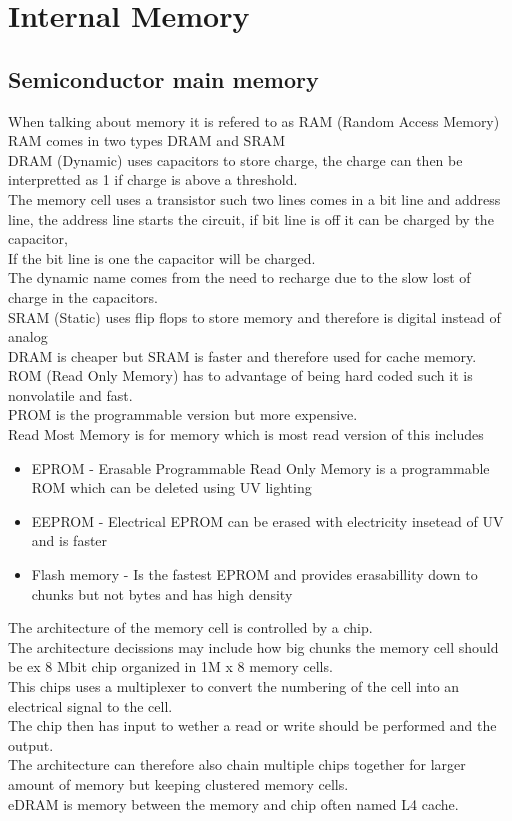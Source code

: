 \documentclass[12pt, a4paper]{article}
\begin{document}
	\section{Internal Memory}
		\subsection{Semiconductor main memory}
			When talking about memory it is refered to as RAM (Random Access Memory)
			RAM comes in two types DRAM and SRAM\\
			DRAM (Dynamic) uses capacitors to store charge, the charge can then be interpretted as 1 if charge is above a threshold.\\
			The memory cell uses a transistor such two lines comes in a bit line and address line, the address line starts the circuit, if bit line is off it can be charged by the capacitor,\\
			If the bit line is one the capacitor will be charged.\\
			The dynamic name comes from the need to recharge due to the slow lost of charge in the capacitors.\\
			SRAM (Static) uses flip flops to store memory and therefore is digital instead of analog\\
			DRAM is cheaper but SRAM is faster and therefore used for cache memory.\\
			ROM (Read Only Memory) has to advantage of being hard coded such it is nonvolatile and fast.\\
			PROM is the programmable version but more expensive.\\
			Read Most Memory is for memory which is most read version of this includes
			\begin{itemize}
				\item EPROM - Erasable Programmable Read Only Memory is a programmable ROM which can be deleted using UV lighting
				\item EEPROM - Electrical EPROM can be erased with electricity insetead of UV and is faster
				\item Flash memory - Is the fastest EPROM and provides erasabillity down to chunks but not bytes and has high density
			\end{itemize}
			The architecture of the memory cell is controlled by a chip.\\
			The architecture decissions may include how big chunks the memory cell should be ex 8 Mbit chip organized in 1M x 8 memory cells.\\
			This chips uses a multiplexer to convert the numbering of the cell into an electrical signal to the cell.\\
			The chip then has input to wether a read or write should be performed and the output.\\
			The architecture can therefore also chain multiple chips together for larger amount of memory but keeping clustered memory cells.\\
			eDRAM is memory between the memory and chip often named L4 cache.
\end{document}
